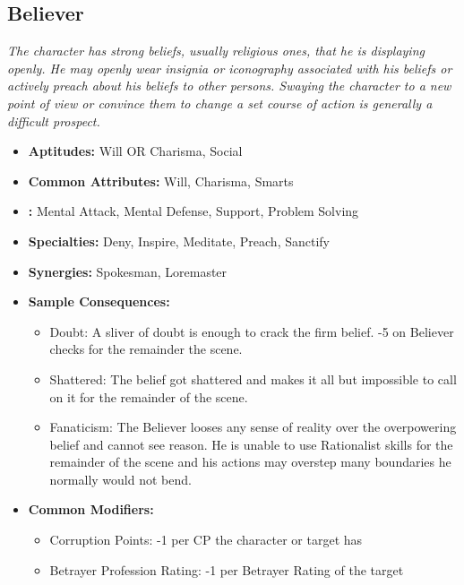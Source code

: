 \subsection{Believer}\label{Believer}
\textit{The character has strong beliefs, usually religious ones, that he is displaying openly.
He may openly wear insignia or iconography associated with his beliefs or actively preach about his beliefs to other persons.
Swaying the character to a new point of view or convince them to change a set course of action is generally a difficult prospect.}
\begin{itemize}
	\item \textbf{Aptitudes:} Will OR Charisma, Social
	\item \textbf{Common Attributes:} Will, Charisma, Smarts
	\item \textbf{:} Mental Attack, Mental Defense, Support, Problem Solving
	\item \textbf{Specialties:} Deny, Inspire, Meditate, Preach, Sanctify
	\item \textbf{Synergies:} Spokesman, Loremaster
	\item \textbf{Sample Consequences:} 
	\begin{itemize}
		\item Doubt: A sliver of doubt is enough to crack the firm belief. -5 on Believer checks for the remainder the scene.
		\item Shattered: The belief got shattered and makes it all but impossible to call on it for the remainder of the scene.
		\item Fanaticism: The Believer looses any sense of reality over the overpowering belief and cannot see reason. He is unable to use Rationalist skills for the remainder of the scene and his actions may overstep many boundaries he normally would not bend.
	\end{itemize}
	\item \textbf{Common Modifiers:}
	\begin{itemize}
		\item Corruption Points: -1 per CP the character or target has
		\item Betrayer Profession Rating: -1 per Betrayer Rating of the target
	\end{itemize}
\end{itemize}


